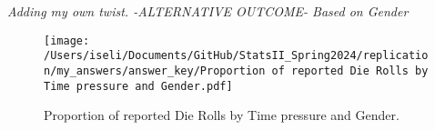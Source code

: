 \documentclass[12pt,letterpaper]{article}
\begin{document}
\noindent \textit{Adding my own twist. -ALTERNATIVE OUTCOME- Based on Gender} \\

	 

\begin{figure}[ht]
	\centering
	\texttt{[image: /Users/iseli/Documents/GitHub/StatsII\_Spring2024/replication/my\_answers/answer\_key/Proportion of reported Die Rolls by Time pressure and Gender.pdf]}
	\caption{Proportion of reported Die Rolls by Time pressure and Gender.}
	\label{fig:dieRollsTimePressureandGender}
\end{figure}
\end{document}
